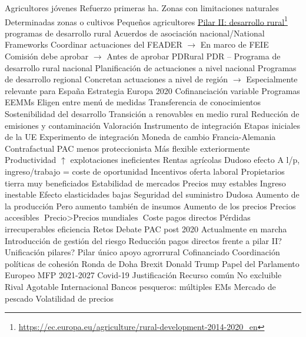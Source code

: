 \documentclass{nuevotema}
\begin{document}
\begin{esquemal}
				\4[3] Agricultores jóvenes
				\4[4] Refuerzo primeras ha.
				\4[5] Zonas con limitaciones naturales
				\4[6] Determinadas zonas o cultivos
				\4[7] Pequeños agricultores
			\3 \underline{Pilar II: desarrollo rural}\footnote{\url{https://ec.europa.eu/agriculture/rural-development-2014-2020_en}}
				 programas de desarrollo rural
				\4 Acuerdos de asociación nacional/National Frameworks
				\4[] Coordinar actuaciones del FEADER
				\4[] $\to$ En marco de FEIE
				\4[] Comisión debe aprobar
				\4[] $\to$ Antes de aprobar PDRural
				\4 PDR -- Programa de desarrollo rural nacional
				\4[] Planificación de actuaciones a nivel nacional
				\4 Programas de desarrollo regional
				\4[] Concretan actuaciones a nivel de región
				\4[] $\to$ Especialmente relevante para España
				\4 Estrategia Europa 2020
				\4 Cofinanciación variable
				\4 Programas EEMMs
				\4 Eligen entre menú de medidas
				\4 Transferencia de conocimientos
				\4 Sostenibilidad del desarrollo
				\4 Transición a renovables en medio rural
				\4 Reducción de emisiones y contaminación
		\2 Valoración
			\3 Instrumento de integración
				\4 Etapas iniciales de la UE
				\4 Experimento de integración
				\4 Moneda de cambio Francia-Alemania
			\3 Contrafactual
				\4 PAC menos proteccionista
				\4 Más flexible exteriormente
			\3 Productividad
				\4 $\uparrow$ explotaciones ineficientes
			\3 Rentas agrícolas
				\4 Dudoso efecto
				\4 A l/p, ingreso/trabajo = coste de oportunidad
				\4 Incentivos oferta laboral
				\4 Propietarios tierra muy beneficiados
			\3 Estabilidad de mercados
				\4 Precios muy estables
				\4 Ingreso inestable
				\4[] Efecto elasticidades bajas
			\3 Seguridad del suministro
				\4 Dudosa
				\4 Aumento de la producción
				\4[] Pero aumento también de insumos
				\4 Aumento de los precios
			\3 Precios accesibles
				\4 $\text{Precio} > \text{Precios mundiales}$
				\4 Coste pagos directos
				\4 Pérdidas irrecuperables eficiencia
		\2 Retos
			\3 Debate PAC post 2020
				\4 Actualmente en marcha
				\4 Introducción de gestión del riesgo
				\4 Reducción pagos directos frente a pilar II?
				\4 Unificación pilares?
				\4[] Pilar único apoyo agrorrural
				\4[] Cofinanciado
				\4 Coordinación políticas de cohesión
			\3 Ronda de Doha
			\3 Brexit
			\3 Donald Trump
			\3 Papel del Parlamento Europeo
			\3 MFP 2021-2027
			\3 Covid-19
	\1 
		\2 Justificación
			\3 Recurso común
				\4 No excluible
				\4 Rival
				\4 Agotable
			\3 Internacional
				\4 Bancos pesqueros: múltiples EMs
			\3 Mercado de pescado
				\4 Volatilidad de precios

\end{esquemal}
\end{document}
